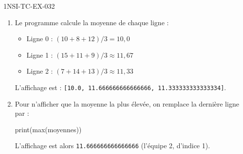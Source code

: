 \begin{corrige}{1NSI-TC-EX-032}
\begin{enumerate}
  \item Le programme calcule la moyenne de chaque ligne :
  \begin{itemize}
    \item Ligne 0 : $(10 + 8 + 12) / 3 = 10{,}0$
    \item Ligne 1 : $(15 + 11 + 9) / 3 \approx 11{,}67$
    \item Ligne 2 : $(7 + 14 + 13) / 3 \approx 11{,}33$
  \end{itemize}
  L'affichage est : \lstinline{[10.0, 11.666666666666666, 11.333333333333334]}.

  \item Pour n'afficher que la moyenne la plus élevée, on remplace la dernière ligne par :
\begin{python}
print(max(moyennes))
\end{python}
  L'affichage est alors \lstinline{11.666666666666666} (l'équipe 2, d'indice 1).
\end{enumerate}
\end{corrige}
